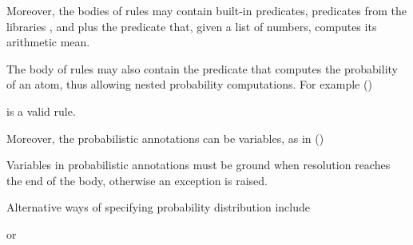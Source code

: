 \documentclass[letterpaper,10pt,english]{sphinxmanual}
\begin{document}
Moreover, the bodies of rules may contain built-in predicates, predicates from the libraries ,
 and  plus the predicate 
that, given a list of numbers, computes its arithmetic mean.

The body of rules may also contain the predicate  that computes the probability of an atom,
thus allowing nested probability computations.
For example ()

\begin{sphinxVerbatim}[commandchars=\\\{\}]
      
\end{sphinxVerbatim}

is a valid rule.

Moreover, the probabilistic annotations can be variables, as in ()

\begin{sphinxVerbatim}[commandchars=\\\{\}]

 
        
\end{sphinxVerbatim}

Variables in probabilistic annotations must be ground when resolution reaches the end of the body, otherwise an exception is raised.

Alternative ways of specifying probability distribution include

\begin{sphinxVerbatim}[commandchars=\\\{\}]
\end{sphinxVerbatim}

or
\end{document}
